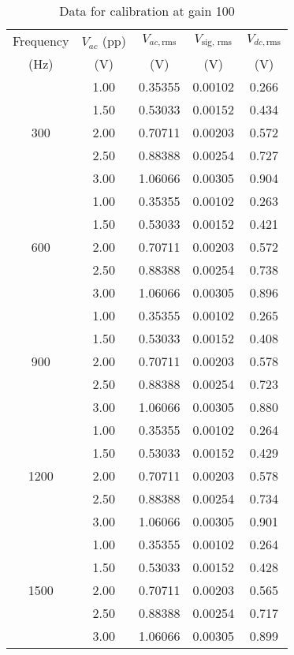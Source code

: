 \begin{table}[H]
    \centering
    \begin{tabular}{|c|c|c|c|c|}
    \hline
    Frequency& $V_{ac}$ (pp)& $V_{ac, \text{rms}}$& $V_\text{sig, rms}$ & $V_{dc, \text{rms}}$ \\
    (Hz) & (V) & (V) & (V) &  (V) \\ \hline
    \multirow{5}{*}{300} & 1.00 & 0.35355 & 0.00102 & 0.266 \\ \cline{2-5} 
    & 1.50 & 0.53033 & 0.00152 & 0.434 \\ \cline{2-5} 
    & 2.00 & 0.70711 & 0.00203 & 0.572 \\ \cline{2-5} 
    & 2.50 & 0.88388 & 0.00254 & 0.727 \\ \cline{2-5} 
    & 3.00 & 1.06066 & 0.00305 & 0.904 \\ \hline
    \multirow{5}{*}{600} & 1.00 & 0.35355 & 0.00102 & 0.263 \\ \cline{2-5} 
    & 1.50 & 0.53033 & 0.00152 & 0.421 \\ \cline{2-5} 
    & 2.00 & 0.70711 & 0.00203 & 0.572 \\ \cline{2-5} 
    & 2.50 & 0.88388 & 0.00254 & 0.738 \\ \cline{2-5} 
    & 3.00 & 1.06066 & 0.00305 & 0.896 \\ \hline
    \multirow{5}{*}{900} & 1.00 & 0.35355 & 0.00102 & 0.265 \\ \cline{2-5} 
    & 1.50 & 0.53033 & 0.00152 & 0.408 \\ \cline{2-5} 
    & 2.00 & 0.70711 & 0.00203 & 0.578 \\ \cline{2-5} 
    & 2.50 & 0.88388 & 0.00254 & 0.723 \\ \cline{2-5} 
    & 3.00 & 1.06066 & 0.00305 & 0.880 \\ \hline
    \multirow{5}{*}{1200} & 1.00 & 0.35355 & 0.00102 & 0.264 \\ \cline{2-5} 
    & 1.50 & 0.53033 & 0.00152 & 0.429 \\ \cline{2-5} 
    & 2.00 & 0.70711 & 0.00203 & 0.578 \\ \cline{2-5} 
    & 2.50 & 0.88388 & 0.00254 & 0.734 \\ \cline{2-5} 
    & 3.00 & 1.06066 & 0.00305 & 0.901 \\ \hline
    \multirow{5}{*}{1500} & 1.00 & 0.35355 & 0.00102 & 0.264 \\ \cline{2-5} 
    & 1.50 & 0.53033 & 0.00152 & 0.428 \\ \cline{2-5} 
    & 2.00 & 0.70711 & 0.00203 & 0.565 \\ \cline{2-5} 
    & 2.50 & 0.88388 & 0.00254 & 0.717 \\ \cline{2-5} 
    & 3.00 & 1.06066 & 0.00305 & 0.899 \\ \hline
    \end{tabular}%
    \caption{Data for calibration at gain 100}
    \label{cal100}
    \end{table}